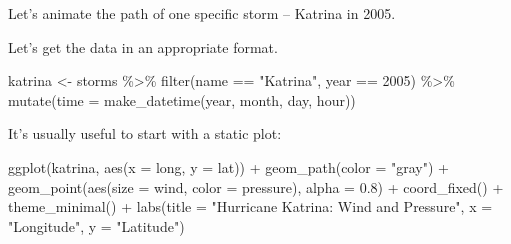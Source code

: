 \documentclass[
  letterpaper,
  DIV=11,
  numbers=noendperiod]{scrartcl}
\newenvironment{Shaded}{\begin{snugshade}}{\end{snugshade}}
\newcommand{\AttributeTok}[1]{\textcolor[rgb]{0.40,0.45,0.13}{#1}}
\newcommand{\DecValTok}[1]{\textcolor[rgb]{0.68,0.00,0.00}{#1}}
\newcommand{\FloatTok}[1]{\textcolor[rgb]{0.68,0.00,0.00}{#1}}
\newcommand{\FunctionTok}[1]{\textcolor[rgb]{0.28,0.35,0.67}{#1}}
\newcommand{\NormalTok}[1]{\textcolor[rgb]{0.00,0.23,0.31}{#1}}
\newcommand{\OtherTok}[1]{\textcolor[rgb]{0.00,0.23,0.31}{#1}}
\newcommand{\SpecialCharTok}[1]{\textcolor[rgb]{0.37,0.37,0.37}{#1}}
\newcommand{\StringTok}[1]{\textcolor[rgb]{0.13,0.47,0.30}{#1}}
\begin{document}
Let's animate the path of one specific storm -- Katrina in 2005.

Let's get the data in an appropriate format.

\begin{Shaded}
\begin{Highlighting}[]
\NormalTok{katrina }\OtherTok{\textless{}{-}}\NormalTok{ storms }\SpecialCharTok{\%\textgreater{}\%}
  \FunctionTok{filter}\NormalTok{(name }\SpecialCharTok{==} \StringTok{"Katrina"}\NormalTok{, year }\SpecialCharTok{==} \DecValTok{2005}\NormalTok{) }\SpecialCharTok{\%\textgreater{}\%}
  \FunctionTok{mutate}\NormalTok{(}\AttributeTok{time =} \FunctionTok{make\_datetime}\NormalTok{(year, month, day, hour))}
\end{Highlighting}
\end{Shaded}

It's usually useful to start with a static plot:

\begin{Shaded}
\begin{Highlighting}[]
\FunctionTok{ggplot}\NormalTok{(katrina, }\FunctionTok{aes}\NormalTok{(}\AttributeTok{x =}\NormalTok{ long, }\AttributeTok{y =}\NormalTok{ lat)) }\SpecialCharTok{+}
  \FunctionTok{geom\_path}\NormalTok{(}\AttributeTok{color =} \StringTok{"gray"}\NormalTok{) }\SpecialCharTok{+}
  \FunctionTok{geom\_point}\NormalTok{(}\FunctionTok{aes}\NormalTok{(}\AttributeTok{size =}\NormalTok{ wind, }\AttributeTok{color =}\NormalTok{ pressure), }\AttributeTok{alpha =} \FloatTok{0.8}\NormalTok{) }\SpecialCharTok{+}
  \FunctionTok{coord\_fixed}\NormalTok{() }\SpecialCharTok{+}
  \FunctionTok{theme\_minimal}\NormalTok{() }\SpecialCharTok{+}
  \FunctionTok{labs}\NormalTok{(}\AttributeTok{title =} \StringTok{"Hurricane Katrina: Wind and Pressure"}\NormalTok{, }\AttributeTok{x =} \StringTok{"Longitude"}\NormalTok{, }\AttributeTok{y =} \StringTok{"Latitude"}\NormalTok{)}
\end{Highlighting}
\end{Shaded}
\end{document}
